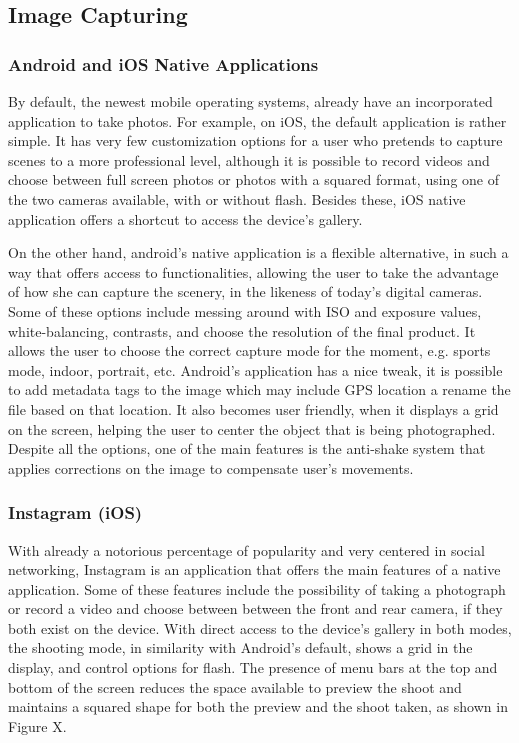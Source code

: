 \subsection{Image Capturing}

\subsubsection{Android and iOS Native Applications}

By default, the newest mobile operating systems, already have an incorporated application to take photos. For example, on iOS, the default application is rather simple. It has very few customization options for a user who pretends to capture scenes to a more professional level, although it is possible to record videos and choose between full screen photos or photos with a squared format, using one of the two cameras available, with or without flash. Besides these, iOS native application offers a shortcut to access the device’s gallery.

On the other hand, android’s native application is a flexible alternative, in such a way that offers access to functionalities, allowing the user to take the advantage of how she can capture the scenery, in the likeness of today’s digital cameras.
Some of these options include messing around with ISO and exposure values, white-balancing, contrasts, and choose the resolution of the final product. It allows the user to choose the correct capture mode for the moment, e.g. sports mode, indoor, portrait, etc.
Android’s application has a nice tweak, it is possible to add metadata tags to the image which may include GPS location a rename the file based on that location. It also becomes user friendly, when it displays a grid on the screen, helping the user to center the object that is being photographed. Despite all the options, one of the main features is the anti-shake system that applies corrections on the image to compensate user’s movements.

\subsubsection{Instagram (iOS)}

With already a notorious percentage of popularity and very centered in social networking, Instagram is an application that offers the main features of a native application. Some of these features include the possibility of taking a photograph or record a video and choose between between the front and rear camera, if they both exist on the device. With direct access to the device’s gallery in both modes, the shooting mode, in similarity with Android’s default, shows a grid in the display, and control options for flash.
The presence of menu bars at the top and bottom of the screen reduces the space available to preview the shoot and maintains a squared shape for both the preview and the shoot taken, as shown in Figure X.


